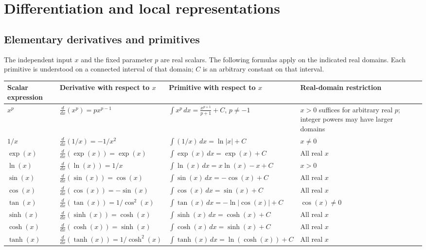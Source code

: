 \documentclass[11pt,oneside,openany]{book}
\begin{document}
\par\addvspace{8pt}\noindent\begin{minipage}{\linewidth}
\section{Differentiation and local representations}

\subsection{Elementary derivatives and primitives}

The independent input \(x\) and the fixed parameter \(p\) are real scalars. The
following formulas apply on the indicated real domains. Each primitive is
understood on a connected interval of that domain; \(C\) is an arbitrary constant
on that interval.

\begingroup\small\setlength{\tabcolsep}{5pt}\renewcommand{\arraystretch}{1.15}
\begin{tabular}{@{}>{\raggedright\arraybackslash}p{}>{\raggedright\arraybackslash}p{}>{\raggedright\arraybackslash}p{}>{\raggedright\arraybackslash}p{}@{}}
\textbf{Scalar expression} & \textbf{Derivative with respect to \(x\)} & \textbf{Primitive with respect to \(x\)} & \textbf{Real-domain restriction} \\[5pt]
\hline
\(x^p\) & \(\frac{d}{dx}(x^p)=px^{p-1}\) & \(\int x^p\,dx=\frac{x^{p+1}}{p+1}+C\), \(p\ne-1\) & \(x>0\) suffices for arbitrary real \(p\); integer powers may have larger domains \\[5pt]
\(1/x\) & \(\frac{d}{dx}(1/x)=-1/x^2\) & \(\int (1/x)\,dx=\ln|x|+C\) & \(x\ne0\) \\[5pt]
\(\exp(x)\) & \(\frac{d}{dx}(\exp(x))=\exp(x)\) & \(\int\exp(x)\,dx=\exp(x)+C\) & All real \(x\) \\[5pt]
\(\ln(x)\) & \(\frac{d}{dx}(\ln(x))=1/x\) & \(\int\ln(x)\,dx=x\ln(x)-x+C\) & \(x>0\) \\[5pt]
\(\sin(x)\) & \(\frac{d}{dx}(\sin(x))=\cos(x)\) & \(\int\sin(x)\,dx=-\cos(x)+C\) & All real \(x\) \\[5pt]
\(\cos(x)\) & \(\frac{d}{dx}(\cos(x))=-\sin(x)\) & \(\int\cos(x)\,dx=\sin(x)+C\) & All real \(x\) \\[5pt]
\(\tan(x)\) & \(\frac{d}{dx}(\tan(x))=1/\cos^2(x)\) & \(\int\tan(x)\,dx=-\ln|\cos(x)|+C\) & \(\cos(x)\ne0\) \\[5pt]
\(\sinh(x)\) & \(\frac{d}{dx}(\sinh(x))=\cosh(x)\) & \(\int\sinh(x)\,dx=\cosh(x)+C\) & All real \(x\) \\[5pt]
\(\cosh(x)\) & \(\frac{d}{dx}(\cosh(x))=\sinh(x)\) & \(\int\cosh(x)\,dx=\sinh(x)+C\) & All real \(x\) \\[5pt]
\(\tanh(x)\) & \(\frac{d}{dx}(\tanh(x))=1/\cosh^2(x)\) & \(\int\tanh(x)\,dx=\ln(\cosh(x))+C\) & All real \(x\) \\[5pt]
\end{tabular}\endgroup

\end{minipage}\par
\end{document}
